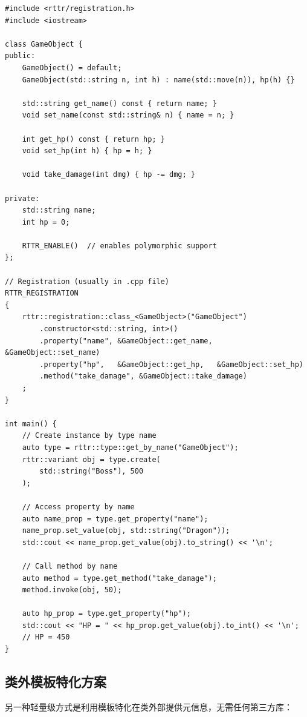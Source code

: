 \documentclass[12pt,a4paper,fontset=fandol]{ctexbook}
\begin{document}
\begin{lstlisting}[caption={RTTR: 类注册与运行时访问}]
#include <rttr/registration.h>
#include <iostream>

class GameObject {
public:
    GameObject() = default;
    GameObject(std::string n, int h) : name(std::move(n)), hp(h) {}

    std::string get_name() const { return name; }
    void set_name(const std::string& n) { name = n; }

    int get_hp() const { return hp; }
    void set_hp(int h) { hp = h; }

    void take_damage(int dmg) { hp -= dmg; }

private:
    std::string name;
    int hp = 0;

    RTTR_ENABLE()  // enables polymorphic support
};

// Registration (usually in .cpp file)
RTTR_REGISTRATION
{
    rttr::registration::class_<GameObject>("GameObject")
        .constructor<std::string, int>()
        .property("name", &GameObject::get_name, &GameObject::set_name)
        .property("hp",   &GameObject::get_hp,   &GameObject::set_hp)
        .method("take_damage", &GameObject::take_damage)
    ;
}

int main() {
    // Create instance by type name
    auto type = rttr::type::get_by_name("GameObject");
    rttr::variant obj = type.create(
        std::string("Boss"), 500
    );

    // Access property by name
    auto name_prop = type.get_property("name");
    name_prop.set_value(obj, std::string("Dragon"));
    std::cout << name_prop.get_value(obj).to_string() << '\n';

    // Call method by name
    auto method = type.get_method("take_damage");
    method.invoke(obj, 50);

    auto hp_prop = type.get_property("hp");
    std::cout << "HP = " << hp_prop.get_value(obj).to_int() << '\n';
    // HP = 450
}
\end{lstlisting}

\subsection{类外模板特化方案}\label{subsec:trait}

另一种轻量级方式是利用模板特化在类外部提供元信息，无需任何第三方库：
\end{document}
